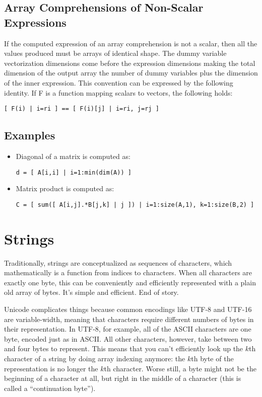 \documentclass{article}
\renewcommand{\sec}[1]{\label{sec:#1}}
\begin{document}
\subsection{Array Comprehensions of Non-Scalar Expressions}
If the computed expression of an array comprehension is not a scalar,
then all the values produced must be arrays of identical shape. The
dummy variable vectorization dimensions come before the expression
dimensions making the total dimension of the output array the number
of dummy variables plus the dimension of the inner expression. This
convention can be expressed by the following identity. If F is a
function mapping scalars to vectors, the following holds:
\begin{verbatim}
[ F(i) | i=ri ] == [ F(i)[j] | i=ri, j=rj ]
\end{verbatim}

\subsection{Examples}

\begin{itemize}
\item Diagonal of a matrix is computed as:
\begin{verbatim}
d = [ A[i,i] | i=1:min(dim(A)) ]
\end{verbatim}
\item Matrix product is computed as:
\begin{verbatim}
C = [ sum([ A[i,j].*B[j,k] | j ]) | i=1:size(A,1), k=1:size(B,2) ]
\end{verbatim}


\end{itemize}

\section{Strings}
\sec{strings}

Traditionally, strings are conceptualized as sequences of characters, which mathematically is a function from indices to characters.
When all characters are exactly one byte, this can be conveniently and efficiently represented with a plain old array of bytes.
It's simple and efficient.
End of story.

Unicode complicates things because common encodings like UTF-8 and UTF-16 are variable-width, meaning that characters require different numbers of bytes in their representation.
In UTF-8, for example, all of the ASCII characters are one byte, encoded just as in ASCII.
All other characters, however, take between two and four bytes to represent.
This means that you can't efficiently look up the $k$th character of a string by doing array indexing anymore:
the $k$th byte of the representation is no longer the $k$th character.
Worse still, a byte might not be the beginning of a character at all, but right in the middle of a character (this is called a ``continuation byte'').
\end{document}
